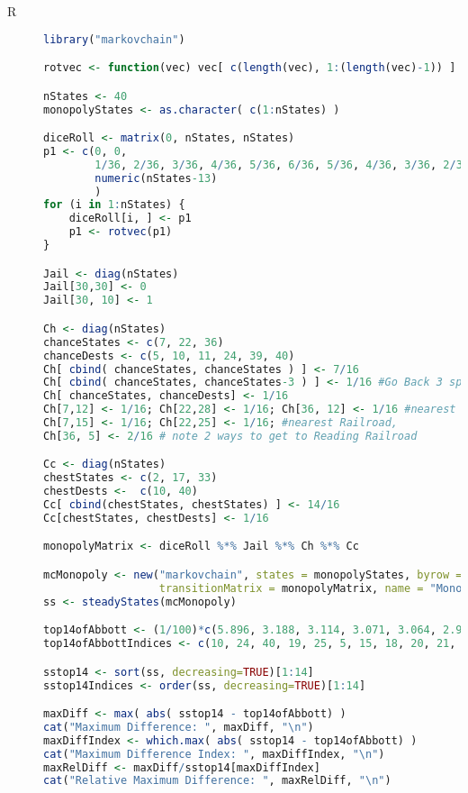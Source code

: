 
\begin{description}



\item[R] 


\begin{lstlisting}[language=R]
library("markovchain")

rotvec <- function(vec) vec[ c(length(vec), 1:(length(vec)-1)) ]

nStates <- 40
monopolyStates <- as.character( c(1:nStates) )

diceRoll <- matrix(0, nStates, nStates)
p1 <- c(0, 0,
        1/36, 2/36, 3/36, 4/36, 5/36, 6/36, 5/36, 4/36, 3/36, 2/36, 1/36,
        numeric(nStates-13)
        )
for (i in 1:nStates) {
    diceRoll[i, ] <- p1
    p1 <- rotvec(p1)
}

Jail <- diag(nStates)
Jail[30,30] <- 0
Jail[30, 10] <- 1

Ch <- diag(nStates)
chanceStates <- c(7, 22, 36)
chanceDests <- c(5, 10, 11, 24, 39, 40)
Ch[ cbind( chanceStates, chanceStates ) ] <- 7/16
Ch[ cbind( chanceStates, chanceStates-3 ) ] <- 1/16 #Go Back 3 spaces
Ch[ chanceStates, chanceDests] <- 1/16
Ch[7,12] <- 1/16; Ch[22,28] <- 1/16; Ch[36, 12] <- 1/16 #nearest utility
Ch[7,15] <- 1/16; Ch[22,25] <- 1/16; #nearest Railroad,
Ch[36, 5] <- 2/16 # note 2 ways to get to Reading Railroad

Cc <- diag(nStates)
chestStates <- c(2, 17, 33)
chestDests <-  c(10, 40)
Cc[ cbind(chestStates, chestStates) ] <- 14/16
Cc[chestStates, chestDests] <- 1/16

monopolyMatrix <- diceRoll %*% Jail %*% Ch %*% Cc

mcMonopoly <- new("markovchain", states = monopolyStates, byrow = TRUE,
                  transitionMatrix = monopolyMatrix, name = "Monopoly")
ss <- steadyStates(mcMonopoly)

top14ofAbbott <- (1/100)*c(5.896, 3.188, 3.114, 3.071, 3.064, 2.993, 2.919, 2.917, 2.875, 2.830, 2.811, 2.777, 2.739, 2.736)
top14ofAbbottIndices <- c(10, 24, 40, 19, 25, 5, 15, 18, 20, 21, 28, 16, 23, 11)

sstop14 <- sort(ss, decreasing=TRUE)[1:14]
sstop14Indices <- order(ss, decreasing=TRUE)[1:14]

maxDiff <- max( abs( sstop14 - top14ofAbbott) )
cat("Maximum Difference: ", maxDiff, "\n")
maxDiffIndex <- which.max( abs( sstop14 - top14ofAbbott) )
cat("Maximum Difference Index: ", maxDiffIndex, "\n")
maxRelDiff <- maxDiff/sstop14[maxDiffIndex]
cat("Relative Maximum Difference: ", maxRelDiff, "\n")


\end{lstlisting}
\end{description}
